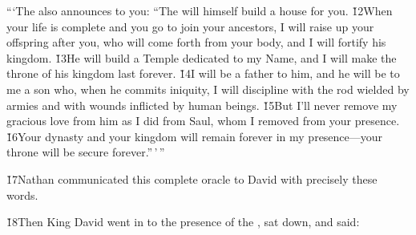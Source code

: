 \begin{poetry}
\poeml ```The  also announces to you: ``The  will himself build a house for you. \v{12}When your life is complete and you go to join your ancestors, I will raise up your offspring after you, who will come forth from your body, and I will fortify his kingdom. \v{13}He will build a Temple dedicated to my Name, and I will make the throne of his kingdom last forever. \v{14}I will be a father to him, and he will be to me a son who, when he commits iniquity, I will discipline with the rod wielded by armies and with wounds inflicted by human beings. \v{15}But I'll never remove my gracious love from him as I did from Saul, whom I removed from your presence. \v{16}Your dynasty and your kingdom will remain forever in my presence---your throne will be secure forever.''\,'\,''
\end{poetry}

\v{17}Nathan communicated this complete oracle to David with precisely these words.

\v{18}Then King David went in to the presence of the , sat down, and said:

